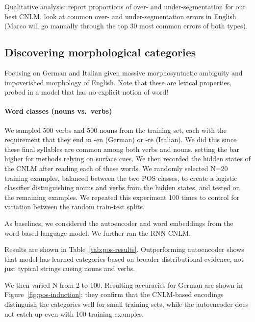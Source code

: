 Qualitative analysis: report proportions of over- and
under-segmentation for our best CNLM, look at common over- and
under-segmentation errors in English (Marco will go manually
through the top 30 most common errors of both types).

\subsection{Discovering morphological categories}
\label{sec:categories}

Focusing on German and Italian given massive morphosyntactic ambiguity
and impoverished morphology of English. Note that these are lexical
properties, probed in a model that has no explicit notion of word!

\paragraph{Word classes (nouns vs.~verbs)}


We sampled 500 verbs and 500 nouns from the training set, each with the requirement that they end in -en (German) or -re (Italian).
We did this since these final syllables are common among both verbs and nouns, setting the bar higher for methods relying on surface cues.
We then recorded the hidden states of the CNLM after reading each of these words.
We randomly selected N=20 training examples, balanced between the two POS classes, to create a logistic classifier distinguishing nouns and verbs from the hidden states, and tested on the remaining examples.
We repeated this experiment 100 times to control for variation between the random train-test splits.

As baselines, we considered the autoencoder and word embeddings from the word-based language model.
We further ran the RNN CNLM.

Results are shown in Table~\ref{tab:pos-results}.
Outperforming autoencoder shows that model has learned categories based on broader distributional evidence, not just typical strings cueing nouns and verbs.


We then varied N from 2 to 100.
Resulting accuracies for German are shown in Figure~\ref{fig:pos-induction}; they confirm that the CNLM-based encodings distinguish the categories well for small training sets, while the autoencoder does not catch up even with 100 training examples.




